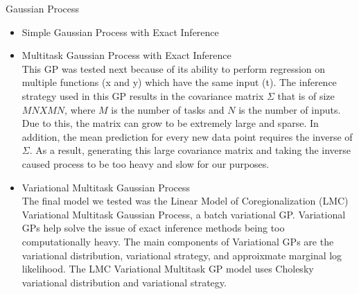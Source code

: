 Gaussian Process
\begin{itemize}
    \item Simple Gaussian Process with Exact Inference \\
    \item Multitask Gaussian Process with Exact Inference \\ 
    This GP was tested next because of its ability to perform regression on multiple functions (x and y) which have the same input (t). The inference strategy used in this GP results in the covariance matrix $\Sigma$ that is of size $MN X MN$, where $M$ is the number of tasks and $N$ is the number of inputs. Due to this, the matrix can grow to be extremely large and sparse. In addition, the mean prediction for every new data point requires the inverse of $\Sigma$. As a result, generating this large covariance matrix and taking the inverse caused process to be too heavy and slow for our purposes. 
    \item Variational Multitask Gaussian Process \\
    The final model we tested was the Linear Model of Coregionalization (LMC) Variational Multitask Gaussian Process, a batch variational GP. Variational GPs help solve the issue of exact inference methods being too computationally heavy. The main components of Variational GPs are the variational distribution, variational strategy, and approixmate marginal log likelihood. The LMC Variational Multitask GP model uses Cholesky variational distribution and variational strategy. 
    
    
\end{itemize}